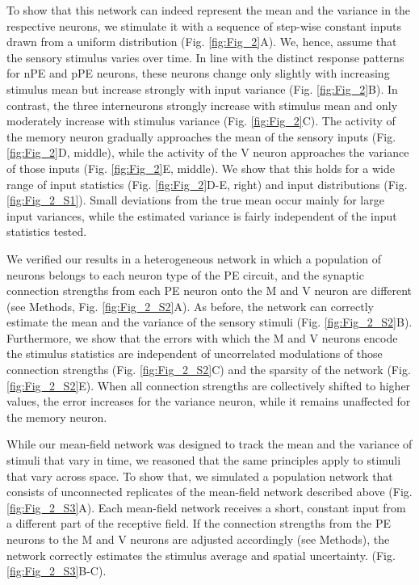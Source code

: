 \documentclass[10pt,a4paper]{article}
\begin{document}
To show that this network can indeed represent the mean and the variance in the respective neurons, we stimulate it with a sequence of step-wise constant inputs drawn from a uniform distribution (Fig. \ref{fig:Fig_2}A). We, hence, assume that the sensory stimulus varies over time. In line with the distinct response patterns for nPE and pPE neurons, these neurons change only slightly with increasing stimulus mean but increase strongly with input variance (Fig. \ref{fig:Fig_2}B). In contrast, the three interneurons strongly increase with stimulus mean and only moderately increase with stimulus variance (Fig. \ref{fig:Fig_2}C). The activity of the memory neuron gradually approaches the mean of the sensory inputs (Fig. \ref{fig:Fig_2}D, middle), while the activity of the V neuron approaches the variance of those inputs (Fig. \ref{fig:Fig_2}E, middle). We show that this holds for a wide range of input statistics (Fig. \ref{fig:Fig_2}D-E, right) and input distributions (Fig. \ref{fig:Fig_2_S1}). Small deviations from the true mean occur mainly for large input variances, while the estimated variance is fairly independent of the input statistics tested. 

We verified our results in a heterogeneous network in which a population of neurons belongs to each neuron type of the PE circuit, and the synaptic connection strengths from each PE neuron onto the M and V neuron are different (see Methods, Fig. \ref{fig:Fig_2_S2}A). As before, the network can correctly estimate the mean and the variance of the sensory stimuli (Fig. \ref{fig:Fig_2_S2}B). Furthermore, we show that the errors with which the M and V neurons encode the stimulus statistics are independent of uncorrelated modulations of those connection strengths (Fig. \ref{fig:Fig_2_S2}C) and the sparsity of the network (Fig. \ref{fig:Fig_2_S2}E). When all connection strengths are collectively shifted to higher values, the error increases for the variance neuron, while it remains unaffected for the memory neuron. 

While our mean-field network was designed to track the mean and the variance of stimuli that vary in time, we reasoned that the same principles apply to stimuli that vary across space. To show that, we simulated a population network that consists of unconnected replicates of the mean-field network described above (Fig. \ref{fig:Fig_2_S3}A). Each mean-field network receives a short, constant input from a different part of the receptive field. If the connection strengths from the PE neurons to the M and V neurons are adjusted accordingly (see Methods), the network correctly estimates the stimulus average and spatial uncertainty. (Fig. \ref{fig:Fig_2_S3}B-C).
\end{document}
